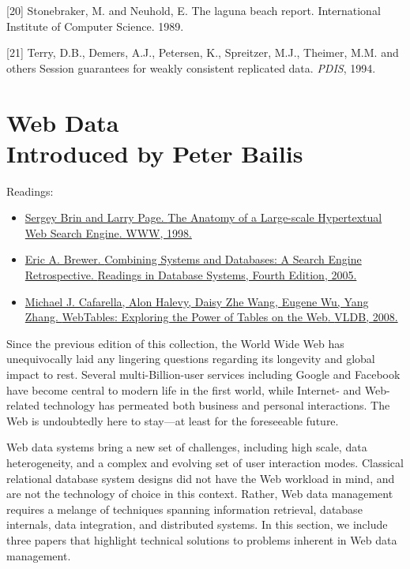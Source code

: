 \documentclass[b5paper,11pt,twoside,openright]{book}
\newcommand\Chapter[3]{
  \hypertarget{#1}{
    \chapter[#2]{#2\\{\Large #3}}
  }
}
\begin{document}
\leavevmode\hypertarget{ref-lagunabeach}{}%
{[}20{]} Stonebraker, M. and Neuhold, E. The laguna beach report.
International Institute of Computer Science. 1989.

\leavevmode\hypertarget{ref-bayou-session}{}%
{[}21{]} Terry, D.B., Demers, A.J., Petersen, K., Spreitzer, M.J.,
Theimer, M.M. and others Session guarantees for weakly consistent
replicated data. \emph{PDIS}, 1994.



\Chapter{ch10-webdata}{%
Web Data
}{%
Introduced by Peter Bailis
}

\begin{framed}
Readings:
\begin{itemize}
\item
\href{https://scholar.google.com/scholar?cluster=9820961755208603037}{Sergey
  Brin and Larry Page. {The Anatomy of a Large-scale Hypertextual Web
    Search Engine}. {WWW}, 1998.}
\item
\href{https://scholar.google.com/scholar?cluster=15869287167041695406}{Eric
  A. Brewer. {Combining Systems and Databases: A Search Engine
    Retrospective}. {Readings in Database Systems, Fourth Edition}, 2005.}
\item
\href{https://scholar.google.com/scholar?cluster=11659194181134800008}{Michael
  J. Cafarella, Alon Halevy, Daisy Zhe Wang, Eugene Wu, Yang Zhang.
  {WebTables: Exploring the Power of Tables on the Web}. {VLDB}, 2008.}
\end{itemize}
\end{framed}

Since the previous edition of this collection, the World Wide Web has
unequivocally laid any lingering questions regarding its longevity and
global impact to rest. Several multi-Billion-user services including
Google and Facebook have become central to modern life in the first
world, while Internet- and Web-related technology has permeated both
business and personal interactions. The Web is undoubtedly here to
stay---at least for the foreseeable future.

Web data systems bring a new set of challenges, including high scale,
data heterogeneity, and a complex and evolving set of user interaction
modes. Classical relational database system designs did not have the Web
workload in mind, and are not the technology of choice in this context.
Rather, Web data management requires a melange of techniques spanning
information retrieval, database internals, data integration, and
distributed systems. In this section, we include three papers that
highlight technical solutions to problems inherent in Web data
management.
\end{document}
